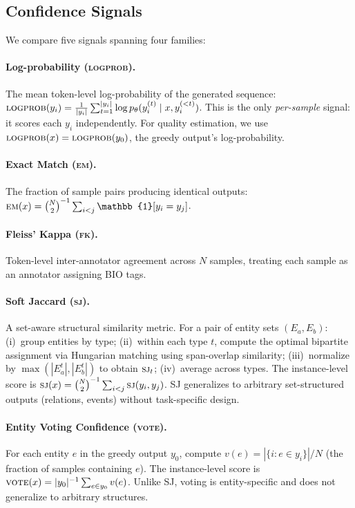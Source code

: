 \documentclass[11pt]{article}
\begin{document}
\subsection{Confidence Signals}

We compare five signals spanning four families:

\paragraph{Log-probability (\textsc{logprob}).}
The mean token-level log-probability of the generated sequence:
$\textsc{logprob}(y_i) = \frac{1}{|y_i|} \sum_{t=1}^{|y_i|} \log p_\theta(y_i^{(t)} \mid x, y_i^{(<t)})$.
This is the only \emph{per-sample} signal: it scores each $y_i$ independently.
For quality estimation, we use $\textsc{logprob}(x) = \textsc{logprob}(y_0)$, the greedy output's log-probability.

\paragraph{Exact Match (\textsc{em}).}
The fraction of sample pairs producing identical outputs:
$\textsc{em}(x) = \binom{N}{2}^{-1} \sum_{i<j} \mathbb{1}[y_i = y_j]$.

\paragraph{Fleiss' Kappa (\textsc{fk}).}
Token-level inter-annotator agreement across $N$ samples, treating each sample as an annotator assigning BIO tags.

\paragraph{Soft Jaccard (\textsc{sj}).}
A set-aware structural similarity metric.
For a pair of entity sets $(E_a, E_b)$:
(i)~group entities by type;
(ii)~within each type $t$, compute the optimal bipartite assignment via Hungarian matching using span-overlap similarity;
(iii)~normalize by $\max(|E_a^t|, |E_b^t|)$ to obtain $\textsc{sj}_t$;
(iv)~average across types.
The instance-level score is $\textsc{sj}(x) = \binom{N}{2}^{-1} \sum_{i<j} \textsc{sj}(y_i, y_j)$.
SJ generalizes to arbitrary set-structured outputs (relations, events) without task-specific design.

\paragraph{Entity Voting Confidence (\textsc{vote}).}
For each entity $e$ in the greedy output $y_0$, compute $v(e) = |\{i : e \in y_i\}|/N$ (the fraction of samples containing $e$).
The instance-level score is $\textsc{vote}(x) = |y_0|^{-1} \sum_{e \in y_0} v(e)$.
Unlike SJ, voting is entity-specific and does not generalize to arbitrary structures.
\end{document}
